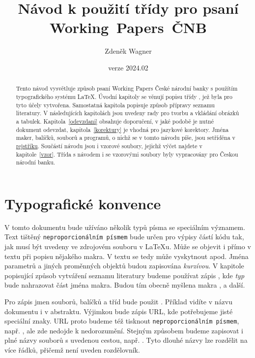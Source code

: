 \documentclass[12pt]{article}
\title{Návod k použití třídy \fn{cnbwp} pro psaní Working~Papers~ČNB}
\author{Zdeněk Wagner}\date{verze 2024.02}
\begin{document}
\maketitle

\begin{abstract}\noindent
Tento návod vysvětluje způsob psaní Working Papers České národní banky s použítím typografického
systému \LaTeX. Úvodní kapitoly se věnují popisu třídy , jež byla pro tyto účely
vytvořena. Samostatná kapitola popisuje způsob přípravy seznamu literatury. V následujících
kapitolách jsou uvedeny rady pro tvorbu a vkládání obrázků a tabulek. Kapitola~\ref{odevzdani}
obsahuje doporučení, v jaké podobě je nutné dokument odevzdat, kapitola~\ref{korektury} je vhodná
pro jazykové korektory. Jména maker, balíčků, souborů a programů, o nichž se v tomto návodu píše,
jsou setříděna v \hyperref[index]{rejstříku}. Součástí návodu jsou i vzorové soubory, jejichž výčet
najdete v kapitole~\ref{vzor}.
Třída s návodem i se vzorovými soubory byly vypracovány pro Českou národní banku.
\end{abstract}

\tableofcontents

\section{Typografické konvence}\label{typokon}
V tomto dokumentu bude užíváno několik typů písma se speciálním významem. Text tištěný
\texttt{neproporcionálním písmem} bude určen pro výpisy částí kódu tak, jak musí být uvedeny ve
zdrojovém souboru v \LaTeX{}u. Může se objevit i přímo v textu při popisu nějakého makra. V textu
se tedy může vyskytnout  apod. Jména parametrů a jiných proměnných objektů budou
zapisována \textit{kurzívou}. V kapitole popisující způsob vytváření seznamu literatury budeme
používat zápis \bibi, kde \textit{typ} bude nahrazovat část jména makra. Budou tím obecně myšlena
makra ,  a další.

Pro zápis jmen souborů, balíčků a tříd bude použit . Příklad vidíte v názvu
dokumentu i v abstraktu. Výjimkou bude zápis URL, kde potřebujeme jisté speciální znaky. URL proto
budeme též tisknout \texttt{neproporcionálním písmem}, např.
, ale zde nedojde k nedorozumění. Stejným způsobem budeme
zapisovat i plné názvy souborů s uvedenou cestou, např.
. Tyto dlouhé názvy lze rozdělit na více
řádků, přičemž není uveden rozdělovník.
\end{document}
